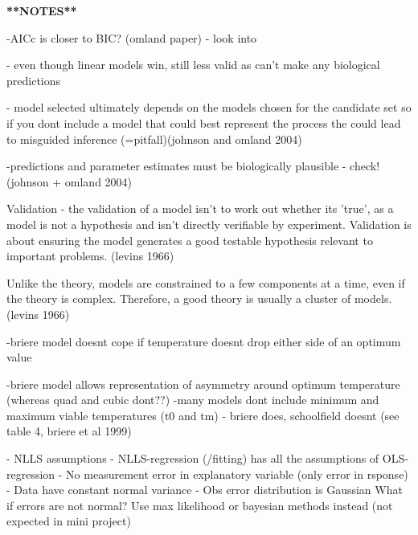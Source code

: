 \documentclass[11pt]{article}
\begin{document}
\textbf{**NOTES**}

-AICc is closer to BIC? (omland paper) - look into

- even though linear models win, still less valid as can't make any biological predictions

- model selected ultimately depends on the models chosen for the candidate set so if you dont include a model that could best represent the process the could lead to misguided inference (=pitfall)(johnson and omland 2004)

-predictions and parameter estimates must be biologically plausible - check! (johnson + omland 2004)

Validation - the validation of a model isn't to work out whether its 'true', as a model is not a hypothesis and isn't directly verifiable by experiment. Validation is about ensuring the model generates a good testable hypothesis relevant to important problems. (levins 1966)

Unlike the theory, models are constrained to a few components at a time, even if the theory is complex. Therefore, a good theory is usually a cluster of models. (levins 1966)

-briere model doesnt cope if temperature doesnt drop either side of an optimum value

-briere model allows representation of asymmetry around optimum temperature (whereas quad and cubic dont??)
-many models dont include minimum and maximum viable temperatures (t0 and tm) - briere does, schoolfield doesnt (see table 4, briere et al 1999)

- NLLS assumptions
	- NLLS-regression (/fitting) has all the assumptions of OLS-regression
		- No measurement error in explanatory variable (only error in rsponse)
		- Data have constant normal variance
		- Obs error distribution is Gaussian
What if errors are not normal? Use max likelihood or bayesian methods instead (not expected in mini project)
\end{document}

